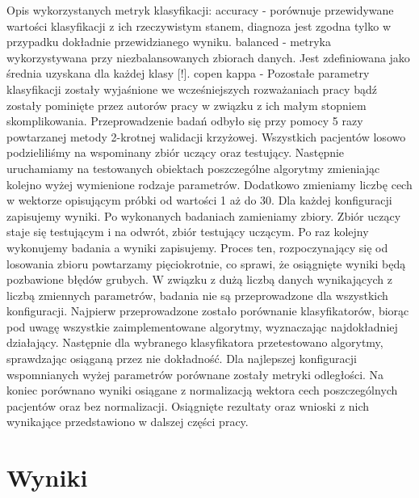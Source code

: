 \documentclass[12pt]{article}
\begin{document}
Opis wykorzystanych metryk klasyfikacji:
\newline
accuracy - porównuje przewidywane wartości klasyfikacji z ich rzeczywistym stanem, diagnoza jest zgodna tylko w przypadku dokładnie przewidzianego wyniku.
\newline
balanced - metryka wykorzystywana przy niezbalansowanych zbiorach danych. Jest zdefiniowana jako średnia uzyskana dla każdej klasy [!].
\newline
copen kappa -  
\newline\newline
\indent Pozostałe parametry klasyfikacji zostały wyjaśnione we wcześniejszych rozważaniach pracy bądź zostały pominięte przez autorów pracy w związku z ich małym stopniem skomplikowania.
\newline
\indent  Przeprowadzenie badań odbyło się przy pomocy 5 razy powtarzanej metody 2-krotnej walidacji krzyżowej. Wszystkich pacjentów losowo podzieliliśmy na wspominany zbiór uczący oraz testujący. Następnie uruchamiamy na testowanych obiektach poszczególne algorytmy zmieniając kolejno wyżej wymienione rodzaje parametrów. Dodatkowo zmieniamy liczbę cech w wektorze opisującym próbki od wartości 1 aż do 30. Dla każdej konfiguracji zapisujemy wyniki. Po wykonanych badaniach zamieniamy zbiory. Zbiór uczący staje się testującym i na odwrót, zbiór testujący uczącym. Po raz kolejny wykonujemy badania a wyniki zapisujemy. Proces ten, rozpoczynający się od losowania zbioru powtarzamy pięciokrotnie, co sprawi, że osiągnięte wyniki będą pozbawione błędów grubych.
\newline
\indent W związku z dużą liczbą danych wynikających z liczbą zmiennych parametrów, badania nie są przeprowadzone dla wszystkich konfiguracji. Najpierw przeprowadzone zostało porównanie klasyfikatorów, biorąc pod uwagę wszystkie zaimplementowane algorytmy, wyznaczając najdokładniej działający. Następnie dla wybranego klasyfikatora przetestowano algorytmy, sprawdzając osiąganą przez nie dokładność. Dla najlepszej konfiguracji wspomnianych wyżej parametrów porównane zostały metryki odległości. Na koniec porównano wyniki osiągane z normalizacją wektora cech poszczególnych pacjentów oraz bez normalizacji. Osiągnięte rezultaty oraz wnioski z nich wynikające przedstawiono w dalszej części pracy.

\section{Wyniki}
\newpage 
\end{document}
